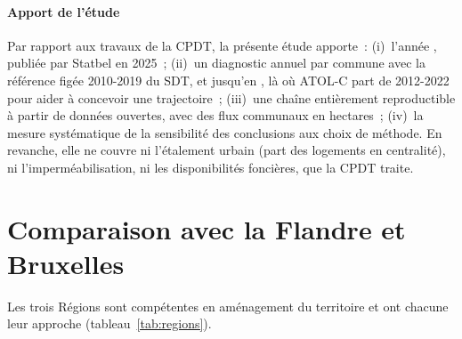 \documentclass[11pt,a4paper]{report}
\begin{document}
\paragraph{Apport de l'étude} Par rapport aux travaux de la CPDT, la présente étude apporte~: (i)~l'année \AnneeFinObs, publiée par Statbel en 2025~; (ii)~un diagnostic annuel par commune avec la référence figée 2010-2019 du SDT, et jusqu'en \AnneeFinObs, là où ATOL-C part de 2012-2022 pour aider à concevoir une trajectoire~; (iii)~une chaîne entièrement reproductible à partir de données ouvertes, avec des flux communaux en hectares~; (iv)~la mesure systématique de la sensibilité des conclusions aux choix de méthode. En revanche, elle ne couvre ni l'étalement urbain (part des logements en centralité), ni l'imperméabilisation, ni les disponibilités foncières, que la CPDT traite.

\section{Comparaison avec la Flandre et Bruxelles}
\label{sec:regions}
Les trois Régions sont compétentes en aménagement du territoire et ont chacune leur approche (tableau~\ref{tab:regions}).
\end{document}
